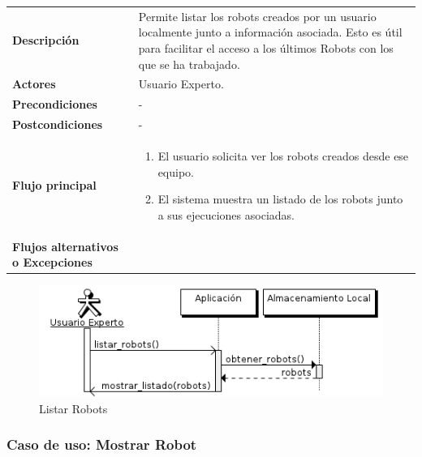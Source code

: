 \begin{tabular}[h]{ p{ } p{ }}

\textbf{Descripción} & Permite listar los robots creados por un
usuario localmente junto a información asociada. Esto es útil para
facilitar el acceso a los últimos Robots con los que se ha
trabajado.\\[3mm]

\textbf{Actores} & Usuario Experto.\\[3mm]

\textbf{Precondiciones} & - \\[3mm]

\textbf{Postcondiciones} & - \\[3mm]

\textbf{Flujo principal} & \begin{enumerate}[leftmargin=1em,topsep=0pt, partopsep=0pt]
  \item El usuario solicita ver los robots creados desde ese equipo.
  \item El sistema muestra un listado de los robots junto a sus
    ejecuciones asociadas.
\end{enumerate}\\[3mm]

\textbf{Flujos alternativos o Excepciones} &
\end{tabular}

\begin{figure}[bp!]
  \includegraphics[width=1\textwidth]{chapters/technical-manual/diagrams/sequence/expert_user/listar_robots.png}
\caption{Listar Robots}
\end{figure}
\clearpage
\subsubsection{\large{Caso de uso: Mostrar Robot}}

